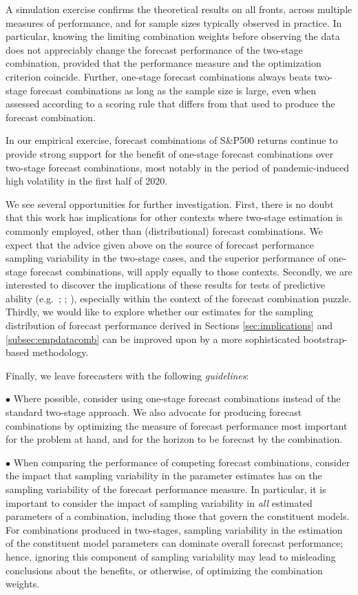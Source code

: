 \documentclass[12pt]{article}
\theoremstyle{definition}
\theoremstyle{remark}
\begin{document}
A simulation exercise confirms the theoretical results on all fronts, across multiple measures of performance, and for sample sizes typically observed in practice. In particular, knowing the limiting combination weights before observing the data does not appreciably change the forecast performance of the two-stage combination, provided that the performance measure and the optimization criterion coincide. Further, one-stage forecast combinations always beats two-stage forecast combinations as long as the sample size is large, even when assessed according to a scoring rule that differs from that used to produce the forecast combination.

In our empirical exercise, forecast combinations of S\&P500 returns continue to provide strong support for the benefit of one-stage forecast combinations over two-stage forecast combinations, most notably in the period of pandemic-induced high volatility in the first half of 2020.

We see several opportunities for further investigation. First, there is no doubt that this work has implications for other contexts where two-stage estimation is commonly employed, other than (distributional) forecast combinations. We expect that the advice given above on the source of forecast performance sampling variability in the two-stage cases, and the superior performance of one-stage forecast combinations, will apply equally to those contexts. Secondly, we are interested to discover the implications of these results for tests of predictive ability (e.g.\ \citealp{Diebold1995}; \citealp{Hansen2005}; \citealp{Giacomini2006}), especially within the context of the forecast combination puzzle. Thirdly, we would like to explore whether our estimates for the sampling distribution of forecast performance derived in Sections \ref{sec:implications} and \ref{subsec:empdatacomb} can be improved upon by a more sophisticated bootstrap-based methodology.

Finally, we leave forecasters with the following \textit{guidelines}:

\smallskip 

\noindent $\bullet$ Where possible, consider using one-stage forecast combinations instead of the standard two-stage approach. We also advocate for producing forecast combinations by optimizing the measure of forecast performance most important for the problem at hand, and for the horizon to be forecast by the combination.

\smallskip 

\noindent $\bullet$ When comparing the performance of competing forecast combinations, consider the impact that sampling variability in the parameter estimates has on the sampling variability of the forecast performance measure. In particular, it is important to consider the impact of sampling variability in \textit{all} estimated parameters of a combination, including those that govern the constituent models. For combinations produced in two-stages, sampling variability in the estimation of the constituent model parameters can dominate overall forecast performance; hence, ignoring this component of sampling variability may lead to misleading conclusions about the benefits, or otherwise, of optimizing the combination weights.
\end{document}
